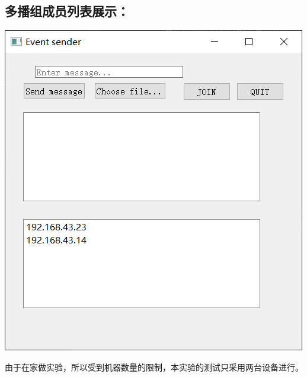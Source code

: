 \documentclass[UTF8]{ctexart}
\begin{document}
\subsection{多播组成员列表展示：}
\par\centerline{\includegraphics[scale=0.4]{group_mem.png}}
\par{由于在家做实验，所以受到机器数量的限制，本实验的测试只采用两台设备进行。}
\end{document}
